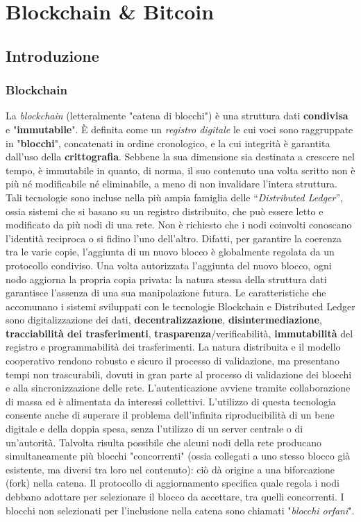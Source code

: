 \chapter{Blockchain \& Bitcoin}

\section{Introduzione}

\subsection{Blockchain}

La \textit{blockchain} (letteralmente "catena di blocchi") è una struttura dati
\textbf{condivisa} e "\textbf{immutabile}". È definita come un \textit{registro
    digitale} le cui voci sono raggruppate in "\textbf{blocchi}", concatenati in
ordine cronologico, e la cui integrità è garantita dall'uso della
\textbf{crittografia}. Sebbene la sua dimensione sia destinata a crescere nel
tempo, è immutabile in quanto, di norma, il suo contenuto una volta scritto non
è più né modificabile né eliminabile, a meno di non invalidare l'intera
struttura. Tali tecnologie sono incluse nella più ampia famiglia delle
“\textit{Distributed Ledger}”, ossia sistemi che si basano su un registro
distribuito, che può essere letto e modificato da più nodi di una rete. Non è
richiesto che i nodi coinvolti conoscano l'identità reciproca o si fidino l'uno
dell'altro. Difatti, per garantire la coerenza tra le varie copie, l'aggiunta di
un nuovo blocco è globalmente regolata da un protocollo condiviso. Una volta
autorizzata l'aggiunta del nuovo blocco, ogni nodo aggiorna la propria copia
privata: la natura stessa della struttura dati garantisce l'assenza di una sua
manipolazione futura. Le caratteristiche che accomunano i sistemi sviluppati con
le tecnologie Blockchain e Distributed Ledger sono digitalizzazione dei dati,
\textbf{decentralizzazione}, \textbf{disintermediazione}, \textbf{tracciabilità
    dei trasferimenti}, \textbf{trasparenza}/verificabilità, \textbf{immutabilità}
del registro e programmabilità dei trasferimenti. La natura distribuita e il
modello cooperativo rendono robusto e sicuro il processo di validazione, ma
presentano tempi non trascurabili, dovuti in gran parte al processo di
validazione dei blocchi e alla sincronizzazione delle rete. L'autenticazione
avviene tramite collaborazione di massa ed è alimentata da interessi collettivi.
L'utilizzo di questa tecnologia consente anche di superare il problema
dell'infinita riproducibilità di un bene digitale e della doppia spesa, senza
l'utilizzo di un server centrale o di un'autorità. Talvolta risulta possibile
che alcuni nodi della rete producano simultaneamente più blocchi "concorrenti"
(ossia collegati a uno stesso blocco già esistente, ma diversi tra loro nel
contenuto): ciò dà origine a una biforcazione (fork) nella catena. Il protocollo
di aggiornamento specifica quale regola i nodi debbano adottare per selezionare
il blocco da accettare, tra quelli concorrenti. I blocchi non selezionati per
l'inclusione nella catena sono chiamati "\textit{blocchi orfani}".

